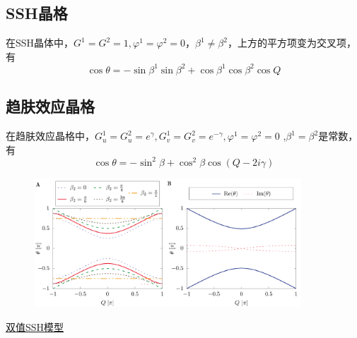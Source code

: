 \documentclass[hyperref,UTF8]{ctexart}
\begin{document}
\subsection*{SSH晶格}
在SSH晶体中，$G^1=G^2=1,\varphi^1=\varphi^2=0$，$\beta^1\neq \beta^2$，上方的平方项变为交叉项，有
\[\cos \theta = -\sin\beta^1 \sin\beta^2+\cos\beta^1\cos\beta^2 \cos Q\]
\subsection*{趋肤效应晶格}
在趋肤效应晶格中，$G_u^1=G_u^2=e^{\gamma},G_v^1=G_v^2=e^{-\gamma},\varphi^1=\varphi^2=0$ ,$\beta^1=\beta^2$是常数，有
\[\cos \theta = -\sin ^2\beta+\cos ^2\beta \cos (Q-2i \gamma)\]
\begin{figure}[H]
    \centering
    \includegraphics[width = 10cm]{skin.png}
\end{figure}
\underline{双值SSH模型}
\end{document}
